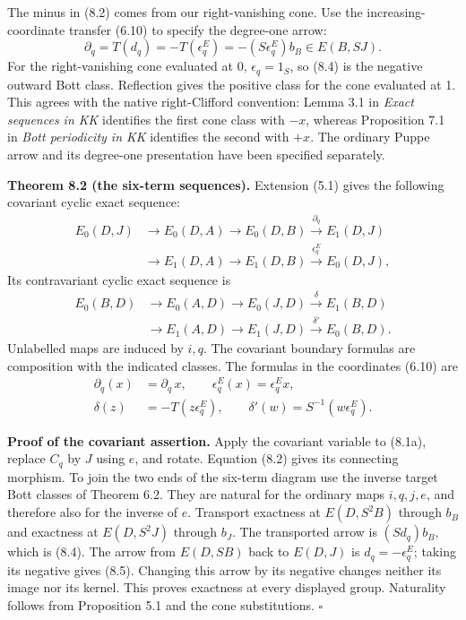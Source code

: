 \documentclass[
  11pt,
]{article}
\begin{document}
The minus in (8.2) comes from our right-vanishing cone. Use the
increasing-coordinate transfer (6.10) to specify the degree-one arrow:
\[
\partial_q=T(d_q)=-T(\epsilon_q^E)
=-(S\epsilon_q^E)b_B\in E(B,SJ).
\tag{8.4}
\] For the right-vanishing cone evaluated at 0, \(\epsilon_q=1_S\), so
(8.4) is the negative outward Bott class. Reflection gives the positive
class for the cone evaluated at 1. This agrees with the native
right-Clifford convention: Lemma 3.1 in \emph{Exact sequences in KK}
identifies the first cone class with \(-x\), whereas Proposition 7.1 in
\emph{Bott periodicity in KK} identifies the second with \(+x\). The
ordinary Puppe arrow and its degree-one presentation have been specified
separately.

\textbf{Theorem 8.2 (the six-term sequences).} Extension (5.1) gives the
following covariant cyclic exact sequence: \[
\begin{aligned}
E_0(D,J)&\to E_0(D,A)\to E_0(D,B)
\xrightarrow{\partial_q}E_1(D,J)\\
&\to E_1(D,A)\to E_1(D,B)
\xrightarrow{\epsilon_q^E}E_0(D,J),
\end{aligned}
\tag{8.5}
\] Its contravariant cyclic exact sequence is \[
\begin{aligned}
E_0(B,D)&\to E_0(A,D)\to E_0(J,D)
\xrightarrow{\delta}E_1(B,D)\\
&\to E_1(A,D)\to E_1(J,D)
\xrightarrow{\delta'}E_0(B,D).
\end{aligned}
\tag{8.6}
\] Unlabelled maps are induced by \(i,q\). The covariant boundary
formulas are composition with the indicated classes. The formulas in the
coordinates (6.10) are \[
\begin{aligned}
\partial_q(x)&=\partial_q\,x,\qquad
\epsilon_q^E(x)=\epsilon_q^E x,\\
\delta(z)&=-T(z\epsilon_q^E),\qquad
\delta'(w)=S^{-1}(w\epsilon_q^E).
\end{aligned}
\tag{8.7}
\]

\textbf{Proof of the covariant assertion.} Apply the covariant variable
to (8.1a), replace \(C_q\) by \(J\) using \(e\), and rotate. Equation
(8.2) gives its connecting morphism. To join the two ends of the
six-term diagram use the inverse target Bott classes of Theorem 6.2.
They are natural for the ordinary maps \(i,q,j,e\), and therefore also
for the inverse of \(e\). Transport exactness at \(E(D,S^2B)\) through
\(b_B\) and exactness at \(E(D,S^2J)\) through \(b_J\). The transported
arrow is \((Sd_q)b_B\), which is (8.4). The arrow from \(E(D,SB)\) back
to \(E(D,J)\) is \(d_q=-\epsilon_q^E\); taking its negative gives (8.5).
Changing this arrow by its negative changes neither its image nor its
kernel. This proves exactness at every displayed group. Naturality
follows from Proposition 5.1 and the cone substitutions. \(\square\)
\end{document}
